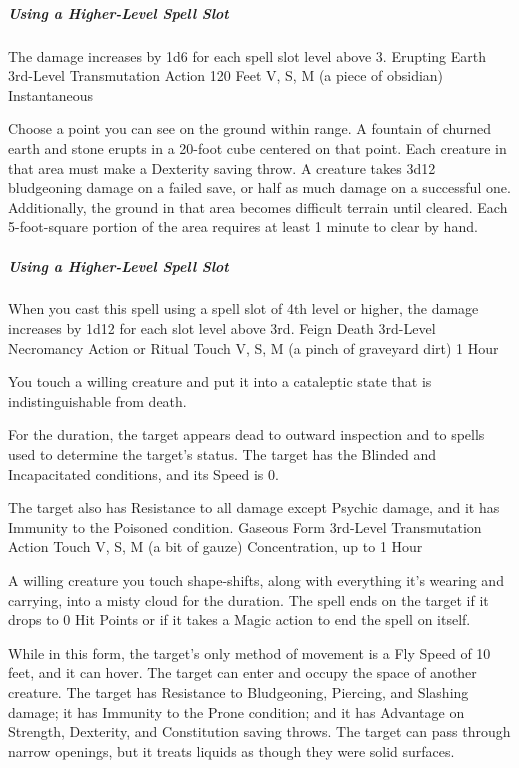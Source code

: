 \documentclass[letterpaper,openany,oneside,twocolumn]{book}
\begin{document}
\subparagraph*{Using a Higher-Level Spell Slot} The damage increases by 1d6 for each spell slot level above 3.
\DndSpellHeader
  {Erupting Earth}
  {3rd-Level Transmutation}
  {Action}
  {120 Feet}
  {V, S, M (a piece of obsidian)}
  {Instantaneous}

Choose a point you can see on the ground within range. A fountain of churned earth and stone erupts in a 20-foot cube centered on that point. Each creature in that area must make a Dexterity saving throw. A creature takes 3d12 bludgeoning damage on a failed save, or half as much damage on a successful one. Additionally, the ground in that area becomes difficult terrain until cleared. Each 5-foot-square portion of the area requires at least 1 minute to clear by hand.

\subparagraph*{Using a Higher-Level Spell Slot} When you cast this spell using a spell slot of 4th level or higher, the damage increases by 1d12 for each slot level above 3rd.
\DndSpellHeader
  {Feign Death}
  {3rd-Level Necromancy}
  {Action or Ritual}
  {Touch}
  {V, S, M (a pinch of graveyard dirt)}
  {1 Hour}

You touch a willing creature and put it into a cataleptic state that is indistinguishable from death.

For the duration, the target appears dead to outward inspection and to spells used to determine the target's status. The target has the Blinded and Incapacitated conditions, and its Speed is 0.

The target also has Resistance to all damage except Psychic damage, and it has Immunity to the Poisoned condition.
\DndSpellHeader
  {Gaseous Form}
  {3rd-Level Transmutation}
  {Action}
  {Touch}
  {V, S, M (a bit of gauze)}
  {Concentration, up to 1 Hour}

A willing creature you touch shape-shifts, along with everything it's wearing and carrying, into a misty cloud for the duration. The spell ends on the target if it drops to 0 Hit Points or if it takes a Magic action to end the spell on itself.

While in this form, the target's only method of movement is a Fly Speed of 10 feet, and it can hover. The target can enter and occupy the space of another creature. The target has Resistance to Bludgeoning, Piercing, and Slashing damage; it has Immunity to the Prone condition; and it has Advantage on Strength, Dexterity, and Constitution saving throws. The target can pass through narrow openings, but it treats liquids as though they were solid surfaces.
\end{document}
